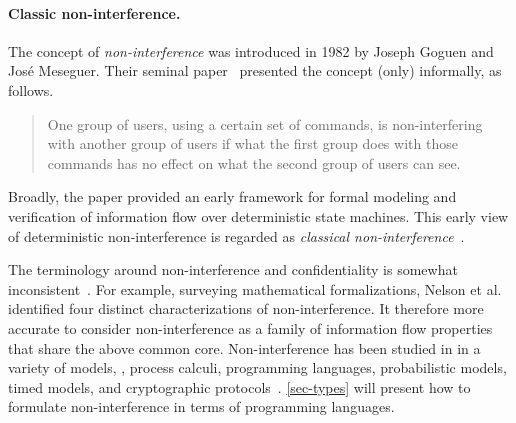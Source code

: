 \paragraph*{Classic non-interference.}
The concept of \emph{non-interference} was introduced in 1982 by Joseph Goguen and José Meseguer.
Their seminal paper~\cite{goguen1982} presented the concept (only) informally, as follows.
\begin{quotation}
\noindent One group of users, using a certain set of commands, is non-interfering with another group of users if what the first group does with those commands has no effect on what the second group of users can see.
\end{quotation}
Broadly, the paper provided an early framework for formal modeling and verification of information flow
over deterministic state machines.
This early view of deterministic non-interference is regarded as \emph{classical non-interference}~\cite{focardi1997}.

The terminology around non-interference and confidentiality 
is somewhat inconsistent~\cite{sabelfeld2003,vandermeyden2007}.
For example, surveying mathematical formalizations, Nelson et al.~\cite{nelson2020} 
identified four distinct characterizations of non-interference.
It therefore more accurate to consider non-interference as a family of 
information flow properties that share the above common core.
Non-interference has been studied in in a variety of models, 
,
process calculi, programming languages, probabilistic models, timed models, and {cryptographic protocols}~\cite{bossi2005}.
\autoref{sec-types} will present how to formulate non-interference in terms of programming languages.

